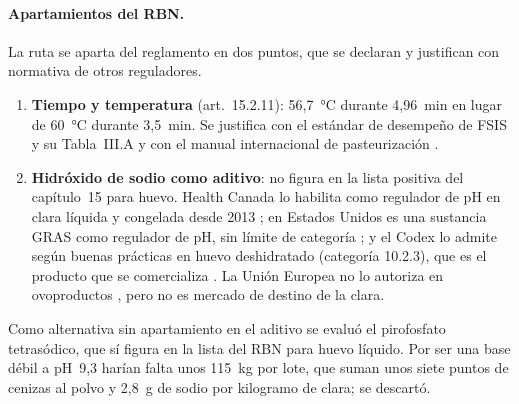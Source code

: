 \paragraph{Apartamientos del RBN.} La ruta se aparta del reglamento en dos puntos, que se
declaran y justifican con normativa de otros reguladores.
\begin{enumerate}
  \item \textbf{Tiempo y temperatura} (art.~15.2.11): 56,7~°C durante
        4,96~min en lugar de 60~°C durante 3,5~min.
        Se justifica con el estándar de desempeño de FSIS y su Tabla~III.A
        \parencite{fsis2026guideline,fsis2020rule} y con el manual internacional de
        pasteurización \parencite{froning2002manual}.
  \item \textbf{Hidróxido de sodio como aditivo}: no figura en la lista positiva del
        capítulo~15 para huevo. Health Canada lo habilita como regulador de pH en clara
        líquida y congelada desde 2013 \parencite{hc2013naoh}; en Estados Unidos es una
        sustancia GRAS como regulador de pH, sin límite de categoría
        \parencite{cfr184_1763}; y el Codex lo admite según buenas prácticas en huevo
        deshidratado (categoría 10.2.3), que es el producto que se comercializa
        \parencite{codex1995gsfa}. La Unión Europea no lo autoriza en ovoproductos
        \parencite{eu1333annexII}, pero no es mercado de destino de la clara.
\end{enumerate}

Como alternativa sin apartamiento en el aditivo se evaluó el pirofosfato tetrasódico,
que sí figura en la lista del RBN para huevo líquido. Por ser una base débil a pH~9,3
harían falta unos 115~kg por lote, que suman unos siete puntos de cenizas
al polvo y 2,8~g de sodio por kilogramo de clara; se descartó.
